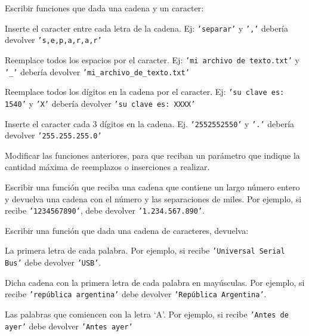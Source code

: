 \begin{ejercicio}
Escribir funciones que dada una cadena y un caracter:
\begin{partes}
\item Inserte el caracter entre cada letra de la cadena. Ej: \texttt{'separar'}
y \texttt{','} debería devolver \texttt{'s,e,p,a,r,a,r'}
\item Reemplace todos los espacios por el caracter. Ej: \texttt{'mi archivo de
texto.txt'} y \texttt{'\_'} debería devolver
\texttt{'mi\_archivo\_de\_texto.txt'}
\item Reemplace todos los dígitos en la cadena por el caracter. Ej: \texttt{'su
clave es: 1540'} y \texttt{'X'} debería devolver \texttt{'su clave es: XXXX'}
\item Inserte el caracter cada 3 dígitos en la cadena. Ej.
\texttt{'2552552550'} y \texttt{'.'} debería devolver \texttt{'255.255.255.0'}
\end{partes}
\end{ejercicio}


\begin{ejercicio}
Modificar las funciones anteriores, para que reciban un parámetro que indique
la cantidad máxima de reemplazos o inserciones a realizar.
\end{ejercicio}


\begin{ejercicio}
Escribir una función que reciba una cadena que contiene un largo número entero y
devuelva una cadena con el número y las separaciones de miles. Por ejemplo, si
recibe \texttt{'1234567890'}, debe devolver \texttt{'1.234.567.890'}.
\end{ejercicio}


\begin{ejercicio}
Escribir una función que dada una cadena de caracteres, devuelva:
\begin{partes}
\item La primera letra de cada palabra. Por ejemplo, si recibe
\texttt{'Universal Serial Bus'} debe devolver \texttt{'USB'}.
\item Dicha cadena con la primera letra de cada palabra en mayúsculas. Por
ejemplo, si recibe \texttt{'república argentina'} debe devolver
\texttt{'República Argentina'}.
\item Las palabras que comiencen con la letra `A'. Por ejemplo, si recibe
\texttt{'Antes de ayer'} debe devolver \texttt{'Antes ayer'}
\end{partes}
\end{ejercicio}


